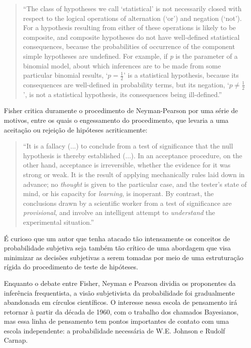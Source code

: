 \begin{quote}
``The class of hypotheses we call `statistical' is not necessarily closed with respect to the logical operations of
alternation (`or') and negation (`not'). For a hypothesis resulting from either of these operations is likely to be composite,
and composite hypotheses do not have well-defined statistical consequences, because the probabilities of occurrence of the
component simple hypotheses are undefined. For example, if {\em p} is the parameter of a binomial model, about which inferences
are to be made from some particular binomial results, `$p = \frac{1}{2}$' is a statistical hypothesis, because its 
consequences are well-defined in probability terms, but its negation, `$p \neq \frac{1}{2}$', is not a statistical hypothesis,
its consequences being ill-defined.''\citep{Edwards72}
\end{quote}

Fisher critica duramente o procedimento de Neyman-Pearson por uma série de motivos, entre os quais o engessamento do procedimento,
que levaria a uma aceitação ou rejeição de hipóteses acriticamente:

\begin{quote}
``It is a fallacy (...) to conclude from a test of significance that the null hypothesis is thereby established (...).
In an acceptance procedure, on the other hand, acceptance is irreversible, whether the evidence for it was strong or weak.
It is the result of applying mechanically rules laid down in advance; no {\em thought} is given to the particular case,
and the tester's state of mind, or his capacity for {\em learning}, is inoperant.
By contrast, the conclusions drawn by a scientific worker from a test of significance are {\em provisional}, and involve
an intelligent attempt to {\em understand} the experimental situation.''\citep{Fisher1955}
\end{quote}

É curioso que um autor que tenha atacado tão intensamente os conceitos de probabilidade subjetiva seja também tão crítico de 
uma abordagem que visa minimizar as decisões subjetivas a serem tomadas por meio de uma estruturação rígida do procedimento
de teste de hipóteses. 

Enquanto o debate entre Fisher, Neyman e Pearson dividia os proponentes da inferência frequentista,
a visão subjetivista da probabilidade foi gradualmente abandonada em círculos científicos. O interesse nessa escola
de pensamento irá retornar à partir da década de 1960, com o trabalho dos chamados Bayesianos, mas essa linha de 
pensamento tem pontos importantes de contato com uma escola independente: a probabilidade necessária de
W.E. Johnson e Rudolf Carnap.

